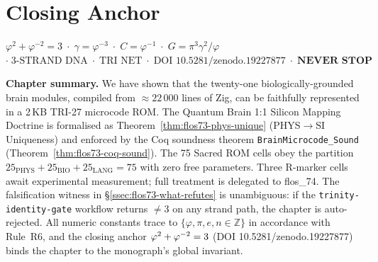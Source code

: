 
\section{Closing Anchor}
\label{sec:flos73-anchor}

\bigskip
\begin{center}
\large
$\varphi^2 + \varphi^{-2} = 3
\;\cdot\; \gamma = \varphi^{-3}
\;\cdot\; C = \varphi^{-1}
\;\cdot\; G = \pi^3\gamma^2/\varphi$\\[4pt]
$\cdot\; \text{3-STRAND DNA}
\;\cdot\; \text{TRI NET}
\;\cdot\; \text{DOI 10.5281/zenodo.19227877}
\;\cdot\; \textbf{NEVER STOP}$
\end{center}

\bigskip
\noindent\textbf{Chapter summary.}
We have shown that the twenty-one biologically-grounded brain modules, compiled
from ${\approx}22\,000$ lines of Zig, can be faithfully represented in a 2\,KB
TRI-27 microcode ROM.  The Quantum Brain 1:1 Silicon Mapping Doctrine is
formalised as Theorem~\ref{thm:flos73-phys-unique} (PHYS$\to$SI Uniqueness)
and enforced by the Coq soundness theorem \texttt{BrainMicrocode\_Sound}
(Theorem~\ref{thm:flos73-coq-sound}).  The 75 Sacred ROM cells obey the
partition $25_{\mathrm{PHYS}} + 25_{\mathrm{BIO}} + 25_{\mathrm{LANG}} = 75$
with zero free parameters.  Three R-marker cells await experimental
measurement; full treatment is delegated to flos\_74.  The falsification
witness in \S\ref{ssec:flos73-what-refutes} is unambiguous: if the
\texttt{trinity-identity-gate} workflow returns $\neq 3$ on any strand path,
the chapter is auto-rejected.  All numeric constants trace to
$\{\varphi, \pi, e, n \in \mathbb{Z}\}$ in accordance with Rule~R6, and the
closing anchor $\varphi^{2}+\varphi^{-2}=3$ (DOI 10.5281/zenodo.19227877) binds the
chapter to the monograph's global invariant.

